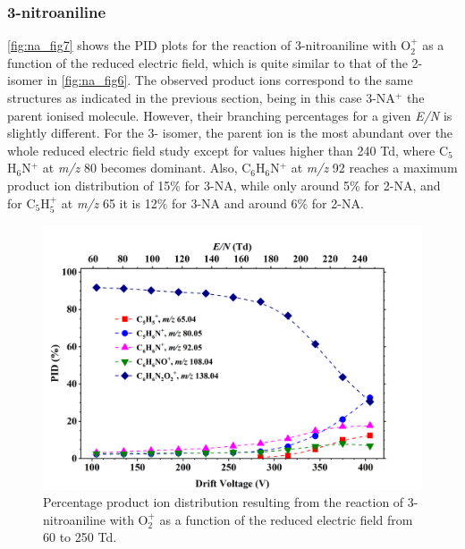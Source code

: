 \subsubsection{3-nitroaniline}
\autoref{fig:na_fig7} shows the PID plots for the reaction of 3-nitroaniline with O$_2^+$ as a function of the reduced electric field, which is quite similar to that of the 2- isomer in \autoref{fig:na_fig6}.
The observed product ions correspond to the same structures as indicated in the previous section, being in this case 3-NA$^+$ the parent ionised molecule.
However, their branching percentages for a given \textit{E/N} is slightly different.
For the 3- isomer, the parent ion is the most abundant over the whole reduced electric field study except for values higher than 240 Td, where C$_5$H$_6$N$^+$ at \textit{m/z} 80 becomes dominant.
Also, C$_6$H$_6$N$^+$ at \textit{m/z} 92 reaches a maximum product ion distribution of 15\% for 3-NA, while only around 5\% for 2-NA, and for C$_5$H$_5^+$ at \textit{m/z} 65 it is 12\% for 3-NA and around 6\% for 2-NA.


\begin{figure}%
\centering
\includegraphics[height=0.35\textheight]{pics/nitros_paper_7.png}
\caption{Percentage product ion distribution resulting from the reaction of 3-nitroaniline with O$_2^+$ as a function of the reduced electric field from 60 to 250 Td.}
\label{fig:na_fig7}
\end{figure}


